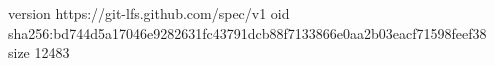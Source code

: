 version https://git-lfs.github.com/spec/v1
oid sha256:bd744d5a17046e9282631fc43791dcb88f7133866e0aa2b03eacf71598feef38
size 12483
